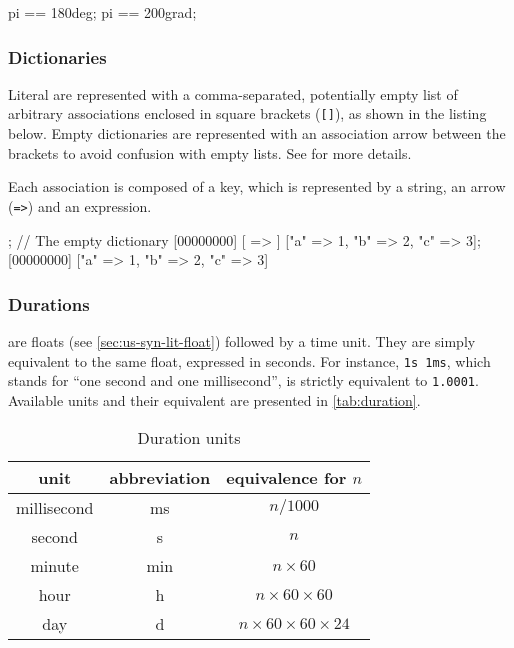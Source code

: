 \begin{urbiassert}
pi == 180deg;
pi == 200grad;
\end{urbiassert}

\subsubsection{Dictionaries}
\label{sec:us-syn-lit-dictionary}

Literal  are represented with a comma-separated,
potentially empty list of arbitrary associations enclosed in square brackets
(\lstinline|[]|), as shown in the listing below.  Empty dictionaries are
represented with an association arrow between the brackets to avoid
confusion with empty lists.  See  for more details.

Each association is composed of a key, which is represented by a string, an
arrow (\lstinline|=>|) and an expression.

\begin{urbiscript}
[ => ]; // The empty dictionary
[00000000] [ => ]
["a" => 1, "b" => 2, "c" => 3];
[00000000] ["a" => 1, "b" => 2, "c" => 3]
\end{urbiscript}

\subsubsection{Durations}

 are floats (see \autoref{sec:us-syn-lit-float})
followed by a time unit. They are simply equivalent to the same float,
expressed in seconds. For instance, \lstinline|1s 1ms|, which stands
for ``one second and one millisecond'', is strictly equivalent to
\lstinline|1.0001|. Available units and their equivalent are presented
in \autoref{tab:duration}.

\begin{table}
  \centering
  \begin{tabular}{|c|c|c|}
    \hline
    unit        & abbreviation & equivalence for $n$  \\
    \hline
    millisecond & ms           & $n / 1000$         \\
    second      & s            & $n$                \\
    minute      & min          & $n \times 60$           \\
    hour        & h            & $n \times 60 \times 60$      \\
    day         & d            & $n \times 60 \times 60 \times 24$ \\
    \hline
  \end{tabular}
  \caption{Duration units}
  \label{tab:duration}
\end{table}

